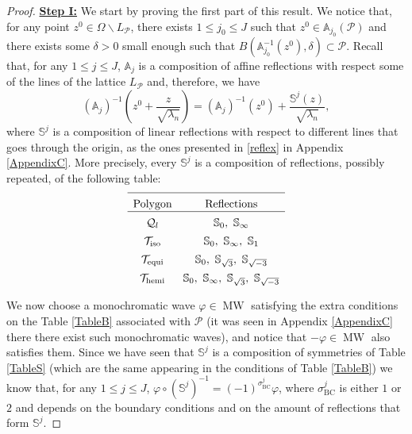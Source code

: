 \documentclass{amsart}
\theoremstyle{definition}
\theoremstyle{remark}
\renewcommand\leq\leqslant
\numberwithin{equation}{section}
\theoremstyle{definition}
\theoremstyle{remark}
\DeclareMathOperator\MW{MW}
\begin{document}
\begin{proof}
	\textbf{	\underline{Step I:}} We start by proving the first part of this result. We notice that, for any point $z^0\in\Omega\backslash L_\mathcal{P}$, there exists $1\leq j_0\leq J$ such that $z^0\in \mathbb{A}_{j_0}(\mathcal{P})$ and there exists some $\delta>0$ small enough such that $B\left(\mathbb{A}_{j_0}^{-1}\left(z^0\right),\delta\right)\subset\mathcal{P}$. Recall that, for any $1\leq j\leq J$, $\mathbb{A}_j$ is a composition of affine reflections with respect some of the lines of the lattice $L_{\mathcal{P}}$ and, therefore, we have 
	\begin{equation}
		\left(\mathbb{A}_j\right)^{-1}\left(z^0+\frac{z}{\sqrt{\lambda_n}}\right)=\left(\mathbb{A}_j\right)^{-1}\left(z^0\right)+\frac{\mathbb{S}^j\left(z\right)}{\sqrt{\lambda_n}},
	\end{equation}where $\mathbb{S}^j$ is a composition of linear reflections with respect to different lines that goes through the origin, as the ones presented in \eqref{reflex} in Appendix \ref{AppendixC}. More precisely, every $\mathbb{S}^j$ is a composition of reflections, possibly repeated, of the following table:
		\begin{equation}\label{TableS}
		\begin{array}{cc} 
			\hline
			\rule{0pt}{3ex}\text{Polygon} & \text{Reflections} \\
			\hline
			\rule{0pt}{3ex}\mathcal{Q}_l& \mathbb{S}_0,\ \mathbb{S}_\infty\\
			\rule{0pt}{3ex}\mathcal{T}_\mathrm{iso} & \mathbb{S}_0,\ \mathbb{S}_\infty,\ \mathbb{S}_1\\
			
			\rule{0pt}{3ex}	\mathcal{T}_\mathrm{equi} & \mathbb{S}_0,\ \mathbb{S}_{\sqrt{3}},\ \mathbb{S}_{\sqrt{-3}} \\
			\rule{0pt}{3ex}\mathcal{T}_\mathrm{hemi} & \mathbb{S}_0,\ \mathbb{S}_\infty,\ \mathbb{S}_{\sqrt{3}},\ \mathbb{S}_{\sqrt{-3}}\\
		\end{array} 
	\end{equation}

We now choose a monochromatic wave $\varphi\in\MW$ satisfying the extra conditions on the Table \ref{TableB} associated with $\mathcal{P}$ (it was seen in Appendix \ref{AppendixC} there there exist such monochromatic waves), and notice that $-\varphi\in\MW$ also satisfies them. Since we have seen that $\mathbb{S}^j$ is a composition of symmetries of Table \ref{TableS} (which are the same appearing in the conditions of Table \ref{TableB}) we know that, for any $1\leq j\leq J$,  $\varphi\circ \left(\mathbb{S}^j\right)^{-1}=\left(-1\right)^{\sigma_\mathrm{BC}^j}\varphi$, where $\sigma_\mathrm{BC}^j$ is either $1$ or $2$ and depends on the boundary conditions and on the amount of reflections that form $\mathbb{S}^j$.
 

\end{proof}
\end{document}
